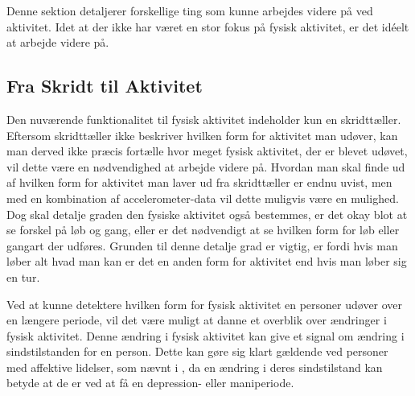 Denne sektion detaljerer forskellige ting som kunne arbejdes videre på ved aktivitet.
Idet at der ikke har været en stor fokus på fysisk aktivitet, er det idéelt at arbejde videre på.

\subsection{Fra Skridt til Aktivitet}
Den nuværende funktionalitet til fysisk aktivitet indeholder kun en skridttæller.
Eftersom skridttæller ikke beskriver hvilken form for aktivitet man udøver, kan man derved ikke præcis fortælle hvor meget fysisk aktivitet, der er blevet udøvet, vil dette være en nødvendighed at arbejde videre på.
Hvordan man skal finde ud af hvilken form for aktivitet man laver ud fra skridttæller er endnu uvist, men med en kombination af accelerometer-data vil dette muligvis være en mulighed.
Dog skal detalje graden den fysiske aktivitet også bestemmes, er det okay blot at se forskel på løb og gang, eller er det nødvendigt at se hvilken form for løb eller gangart der udføres.
Grunden til denne detalje grad er vigtig, er fordi hvis man løber alt hvad man kan er det en anden form for aktivitet end hvis man løber sig en tur.

Ved at kunne detektere hvilken form for fysisk aktivitet en personer udøver over en længere periode, vil det være muligt at danne et overblik over ændringer i fysisk aktivitet.
Denne ændring i fysisk aktivitet kan give et signal om ændring i sindstilstanden for en person.
Dette kan gøre sig klart gældende ved personer med affektive lidelser, som nævnt i \citet[Kapitel 1, Sektion 4]{misc:faellesrapp}, da en ændring i deres sindstilstand kan betyde at de er ved at få en depression- eller maniperiode.

\begin{comment}
Den nuværende funktionalitet til fysisk aktivitet er kun en skridttæller, fra denne vil det næste logiske skridt være at lave noget der kan give et overblik over hvor meget fysisk aktivitet der har været ud fra antallet af skridt.
Helt præcist hvordan dette skal gøres og vises er uvist, men der er en mulighed for at det skulle kombineres med accelerometer data til at afgøre om der er tale om løb, gang eller anden form for bevægelse.
De forskellige gang typer skal så også fortolkes som forskellige form for aktivitet. 
Det ville også være nødvendigt at beslutte hvad for en enhed fysisk aktivitet er i, er det i Joule forbrændt eller noget andet?

Udover at beslutte hvordan fysisk aktivitet skal bestemmes skal man også beslutte sig for hvad det skal bruges til.
I sammenhæng med det primære fokus vi har på affektive lidelser, vil et oplagt fokus være at se på ændringer i mængden af fysisk aktivitet, da det giver et signal om ændringer i sindstilstand for patienter med affektive lidelser, hvilket også blev nævnt i \citet[Kapitel 1, Sektion 4]{misc:faellesrapp}.
\end{comment}
